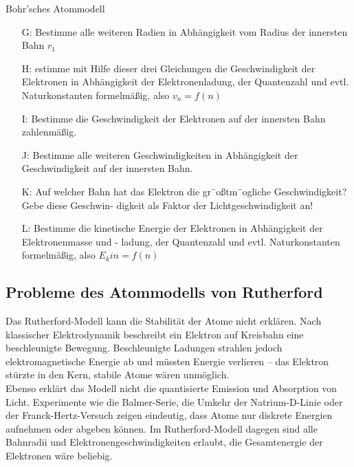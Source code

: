 \documentclass[11pt,a4paper,oneside]{article}
\begin{document}
\begin{aufgabe}{Bohr'sches Atommodell}
\begin{itemize}[left=20mm]
\begin{itemize}[left=-10mm]
				\item [G:] Bestimme alle weiteren Radien in Abhängigkeit vom Radius der innersten Bahn $r_1$
				\item [H:] estimme mit Hilfe dieser drei Gleichungen die Geschwindigkeit der Elektronen in Abhängigkeit der Elektronenladung, der Quantenzahl und evtl. Naturkonstanten formelmäßig, also $v_n = f(n)$
				\item [I:] Bestimme die Geschwindigkeit der Elektronen auf der innersten Bahn zahlenmäßig.
				\item [J:] Bestimme alle weiteren Geschwindigkeiten in Abhängigkeit der Geschwindigkeit auf der innersten Bahn.
			    \item [K:] Auf welcher Bahn hat das Elektron die gr¨oßtm¨ogliche Geschwindigkeit? Gebe diese Geschwin-
			    digkeit als Faktor der Lichtgeschwindigkeit an!
				\item [L:] Bestimme die kinetische Energie der Elektronen in Abhängigkeit der Elektronenmasse und -
				ladung, der Quantenzahl und evtl. Naturkonstanten formelmäßig, also $E_kin = f(n)$
			\end{itemize}
		\end{itemize}
	\end{aufgabe}
	
	\newpage
	
	
	\subsection{Probleme des Atommodells von Rutherford}
	
	Das Rutherford-Modell kann die Stabilität der Atome nicht erklären. 
	Nach klassischer Elektrodynamik beschreibt ein Elektron auf Kreisbahn 
	eine beschleunigte Bewegung. Beschleunigte Ladungen strahlen jedoch 
	elektromagnetische Energie ab und müssten Energie verlieren – 
	das Elektron stürzte in den Kern, stabile Atome wären unmöglich. \\
	
	Ebenso erklärt das Modell nicht die quantisierte Emission und Absorption 
	von Licht. Experimente wie die Balmer-Serie, die Umkehr der Natrium-D-Linie 
	oder der Franck-Hertz-Versuch zeigen eindeutig, dass Atome nur diskrete 
	Energien aufnehmen oder abgeben können. Im Rutherford-Modell dagegen 
	sind alle Bahnradii und Elektronengeschwindigkeiten erlaubt, 
	die Gesamtenergie der Elektronen wäre beliebig.
	
\end{document}
